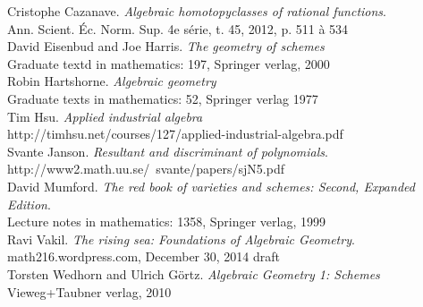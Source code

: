 \begin{thebibliography}{}

Cristophe Cazanave. 
\textit{Algebraic homotopyclasses of rational functions}. \\
Ann. Scient. Éc. Norm. Sup. 4e série, t. 45, 2012, p. 511 à 534 \\

David Eisenbud and Joe Harris.
\textit{The geometry of schemes} \\
Graduate textd in mathematics: 197, Springer verlag, 2000 \\

Robin Hartshorne.
\textit{Algebraic geometry} \\
Graduate texts in mathematics: 52, Springer verlag 1977 \\

Tim Hsu.
\textit{Applied industrial algebra} \\
http://timhsu.net/courses/127/applied-industrial-algebra.pdf \\

Svante Janson.
\textit{Resultant and discriminant of polynomials}.\\
http://www2.math.uu.se/~svante/papers/sjN5.pdf \\

David Mumford.
\textit{The red book of varieties and schemes: Second, Expanded Edition}. \\
Lecture notes in mathematics: 1358, Springer verlag, 1999 \\

Ravi Vakil.
\textit{The rising sea: Foundations of Algebraic Geometry}.\\
math216.wordpress.com, December 30, 2014 draft \\


Torsten Wedhorn and Ulrich Görtz.
\textit{Algebraic Geometry 1: Schemes} \\
Vieweg+Taubner verlag, 2010

\end{thebibliography}